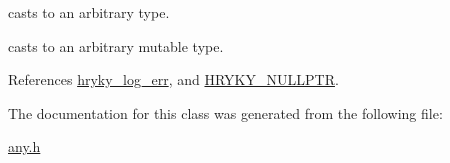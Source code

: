 casts to an arbitrary type. 

casts to an arbitrary mutable type. 

References \hyperlink{log__writer__common_8h_ae5ad3dabb33f594695ef40753cb78aad}{hryky\-\_\-log\-\_\-err}, and \hyperlink{common_8h_a4cd4ac09cfcdbd6b30ee69afc156e210}{H\-R\-Y\-K\-Y\-\_\-\-N\-U\-L\-L\-P\-T\-R}.



The documentation for this class was generated from the following file\-:\begin{DoxyCompactItemize}
\item 
\hyperlink{any_8h}{any.\-h}\end{DoxyCompactItemize}
